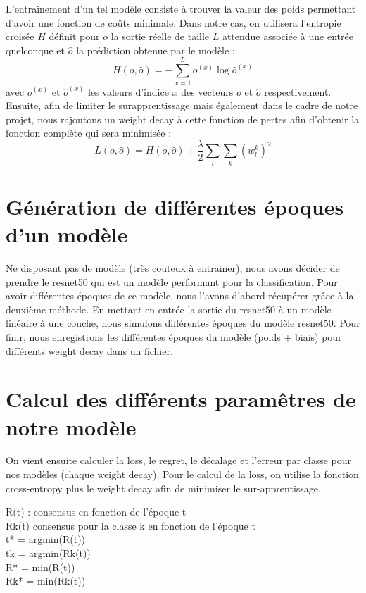 \documentclass[12pt,english, openany]{book}
\begin{document}
L'entraînement d'un tel modèle consiste à trouver la valeur des poids permettant d'avoir une fonction de coûts minimale. Dans notre cas, on utilisera l'entropie croisée $H$ définit pour $o$ la sortie réelle de taille $L$ attendue associée à une entrée quelconque et $\hat{o}$ la prédiction obtenue par le modèle :
$$
H(o, \hat{o}) = - \sum_{x = 1}^{L} o^{(x)} \log \hat{o}^{(x)}
$$
avec $o^{(x)}$ et $\hat{o}^{(x)}$ les valeurs d'indice $x$ des vecteurs $o$ et $\hat{o}$ respectivement.\\

Ensuite, afin de limiter le surapprentissage mais également dans le cadre de notre projet, nous rajoutons un weight decay à cette fonction de pertes afin d'obtenir la fonction complète qui sera minimisée : 
$$
L(o, \hat{o}) = H(o, \hat{o}) + \frac{\lambda }{2}\sum_l\sum_k (w^k_l)^2
$$
\section{Génération de différentes époques d'un modèle}

Ne disposant pas de modèle (très couteux à entrainer), nous avons décider de prendre le resnet50 qui est un modèle performant pour la classification. Pour avoir différentes époques de ce modèle, nous l'avons d'abord récupérer grâce à la deuxième méthode. En mettant en entrée la sortie du resnet50 à un modèle linéaire à une couche, nous simulons différentes époques du modèle resnet50. Pour finir, nous enregistrons les différentes époques du modèle (poids + biais) pour différents weight decay dans un fichier.

\section{Calcul des différents paramêtres de notre modèle}

On vient ensuite calculer la loss, le regret, le décalage et l'erreur par classe pour nos modèles (chaque weight decay).
Pour le calcul de la loss, on utilise la fonction cross-entropy plus le weight decay afin de minimiser le sur-apprentissage.

R(t) : consensus en fonction de l'époque t\\
Rk(t) consensus pour la classe k en fonction de l'époque t\\

t* = argmin(R(t))\\
tk = argmin(Rk(t)) \\
R* = min(R(t)) \\
Rk* = min(Rk(t))\\ 
\end{document}

